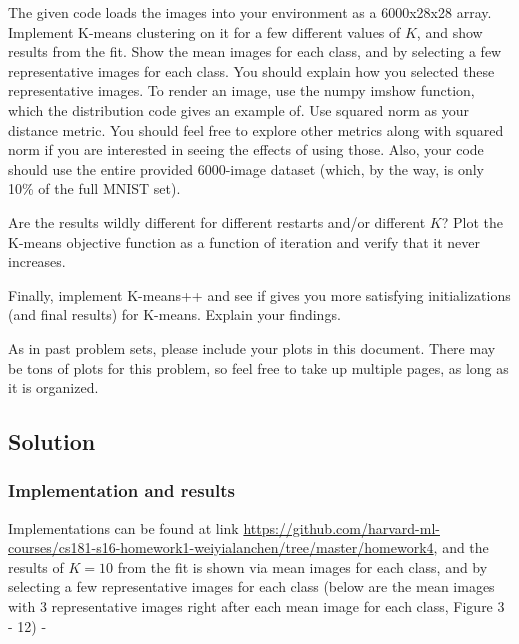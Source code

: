 \documentclass[submit]{harvardml}
\begin{document}
\begin{problem}
The given code loads the images into your environment as a 6000x28x28 array.
Implement K-means clustering on it for a few different values of $K$, and show
results from the fit. Show the mean images for each class, and by selecting a
few representative images for each class. You should explain how you selected
these representative images. To render an image, use the numpy imshow function,
which the distribution code gives an example of. Use squared norm as your
distance metric. You should feel free to explore other metrics along with
squared norm if you are interested in seeing the effects of using those. Also,
your code should use the entire provided 6000-image dataset (which, by the way,
is only 10\% of the full MNIST set).

Are the results wildly different for different restarts and/or different $K$?
Plot the K-means objective function as a function of iteration and verify that
it never increases.

Finally, implement K-means++ and see if gives you more satisfying
initializations (and final results) for K-means. Explain your findings.

As in past problem sets, please include your plots in this document. There may
be tons of plots for this problem, so feel free to take up multiple pages, as
long as it is organized.
\end{problem}
\subsection*{Solution}

\subsubsection*{Implementation and results}

Implementations can be found at link \url{https://github.com/harvard-ml-courses/cs181-s16-homework1-weiyialanchen/tree/master/homework4}, and the results of $K=10$ from the fit is shown via mean images for each class, and by selecting a few representative images for each class (below are the mean images with 3 representative images right after each mean image for each class, Figure 3 - 12) - 
\end{document}
